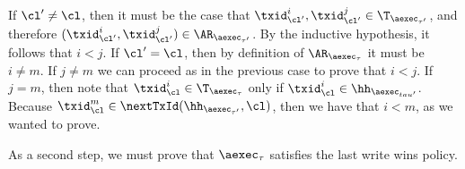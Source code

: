 \begin{itemize}
\begin{itemize}
If $\cl' \neq \cl$, then it must be the case that $\txid_{\cl'}^{i}, \txid_{\cl'}^{j} \in \T_{\aexec_{\tau'}}$, 
and therefore $(\txid_{\cl'}^{i}, \txid_{\cl'}^{j}) \in \AR_{\aexec_{\tau'}}$. By the inductive hypothesis, 
it follows that $i < j$. If $\cl' = \cl$, then by definition of $\AR_{\aexec_{\tau}}$ it must be  $i \neq m$. 
If $j \neq m$ we can proceed as in the previous case to prove that $i < j$. If $j = m$, then 
note that $\txid_{\cl}^{i} \in \T_{\aexec_{\tau}}$ only if $\txid_{\cl}^{i} \in \hh_{\aexec_{tau'}}$. 
Because $\txid_{\cl}^{m} \in \nextTxId(\hh_{\aexec_{\tau'}}, \cl)$, then we have that $i < m$, 
as we wanted to prove.
\end{itemize}

{\color{red} As a second step, we must prove that $\aexec_{\tau}$ satisfies the last write wins policy.}
\end{itemize}